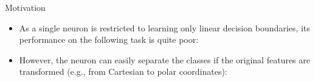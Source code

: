 \begin{vbframe}{Motivation}
\begin{itemize}
\item As a single neuron is restricted to learning only linear decision boundaries, its performance on the following task is quite poor:
\begin{figure}
\centering
{}
\end{figure}
\item However, the neuron can easily separate the classes if the original features are transformed (e.g., from Cartesian to polar coordinates): 
\begin{figure}
\centering
{}
\end{figure}
\end{itemize}
\framebreak


\end{vbframe}
